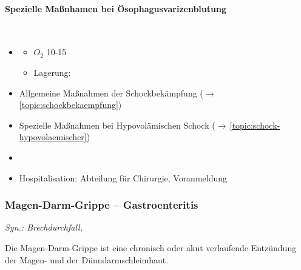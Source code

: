 \begin{gMassnahmenEnv}
    \paragraph{Spezielle Maßnhamen bei Ösophagusvarizenblutung}~
    
    \begin{itemize}
    \item \gTxMassVitBes
    \begin{itemize}
        \item $O_2$ 10-15\gLMin
        \item Lagerung: 
    \end{itemize}
    \item Allgemeine Maßnahmen der Schockbekämpfung
    ($\rightarrow$\,\ref{topic:schockbekaempfung})
    \item Spezielle Maßnahmen bei Hypovolämischen Schock
    ($\rightarrow$\,\ref{topic:schock-hypovolaemischer})
    \item {}
    \item Hospitalisation: Abteilung für Chirurgie, Voranmeldung
\end{itemize}
\end{gMassnahmenEnv}






\subsubsection{Magen-Darm-Grippe -- Gastroenteritis}

\emph{Syn.: Brechdurchfall, }

Die Magen-Darm-Grippe ist eine chronisch oder akut
verlaufende Entzündung der Magen- und der Dünndarmschleimhaut. 

